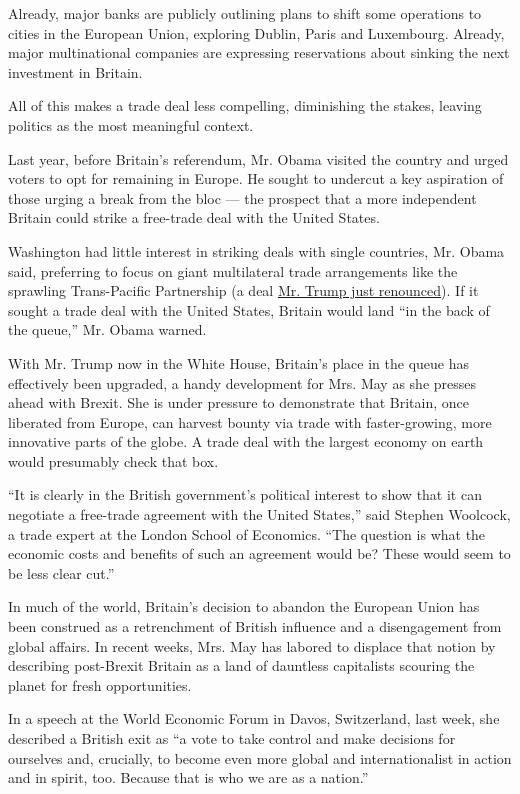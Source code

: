 Already, major banks are publicly outlining plans to shift some
operations to cities in the European Union, exploring Dublin, Paris and
Luxembourg. Already, major multinational companies are expressing
reservations about sinking the next investment in Britain.

All of this makes a trade deal less compelling, diminishing the stakes,
leaving politics as the most meaningful context.

Last year, before Britain's referendum, Mr. Obama visited the country
and urged voters to opt for remaining in Europe. He sought to undercut a
key aspiration of those urging a break from the bloc --- the prospect
that a more independent Britain could strike a free-trade deal with the
United States.

Washington had little interest in striking deals with single countries,
Mr. Obama said, preferring to focus on giant multilateral trade
arrangements like the sprawling Trans-Pacific Partnership (a deal
\href{https://www.nytimes3xbfgragh.onion/2017/01/23/us/politics/tpp-trump-trade-nafta.html?_r=0}{Mr.
Trump just renounced}). If it sought a trade deal with the United
States, Britain would land ``in the back of the queue,'' Mr. Obama
warned.

With Mr. Trump now in the White House, Britain's place in the queue has
effectively been upgraded, a handy development for Mrs. May as she
presses ahead with Brexit. She is under pressure to demonstrate that
Britain, once liberated from Europe, can harvest bounty via trade with
faster-growing, more innovative parts of the globe. A trade deal with
the largest economy on earth would presumably check that box.

``It is clearly in the British government's political interest to show
that it can negotiate a free-trade agreement with the United States,''
said Stephen Woolcock, a trade expert at the London School of Economics.
``The question is what the economic costs and benefits of such an
agreement would be? These would seem to be less clear cut.''

In much of the world, Britain's decision to abandon the European Union
has been construed as a retrenchment of British influence and a
disengagement from global affairs. In recent weeks, Mrs. May has labored
to displace that notion by describing post-Brexit Britain as a land of
dauntless capitalists scouring the planet for fresh opportunities.

In a speech at the World Economic Forum in Davos, Switzerland, last
week, she described a British exit as ``a vote to take control and make
decisions for ourselves and, crucially, to become even more global and
internationalist in action and in spirit, too. Because that is who we
are as a nation.''

